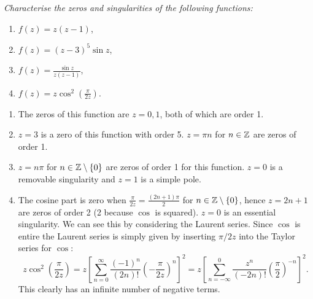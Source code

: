 \documentclass{article}
\begin{document}
    \begin{example}
        {\itshape
        Characterise the zeros and singularities of the following functions:
        \begin{enumerate}
            \item \(f(z) = z(z - 1)\),
            \item \(f(z) = (z - 3)^5\sin z\),
            \item \(f(z) = \frac{\sin z}{z(z - 1)}\),
            \item \(f(z) = z\cos^2\left( \frac{\pi}{2z} \right)\).
        \end{enumerate}
        }
        \begin{enumerate}
            \item The zeros of this function are \(z = 0, 1\), both of which are order 1.
            \item \(z = 3\) is a zero of this function with order 5.
            \(z = \pi n\) for \(n\in\mathbb{Z}\) are zeros of order 1.
            \item \(z = n\pi\) for \(n\in\mathbb{Z}\setminus\{0\}\) are zeros of order 1 for this function.
            \(z = 0\) is a removable singularity and \(z = 1\) is a simple pole.
            \item The cosine part is zero when \(\frac{\pi}{2z} = \frac{(2n+1)\pi}{2}\) for \(n\in\mathbb{Z}\setminus\{0\}\), hence \(z = 2n + 1\) are zeros of order 2 (2 because \(\cos\) is squared).
            \(z = 0\) is an essential singularity.
            We can see this by considering the Laurent series.
            Since \(\cos\) is entire the Laurent series is simply given by inserting \(\pi/2z\) into the Taylor series for \(\cos\):
            \[z\cos^2\left( \frac{\pi}{2z} \right) = z\left[ \sum_{n=0}^{\infty} \frac{(-1)^n}{(2n)!}\left( -\frac{\pi}{2z} \right)^n \right]^2 = z\left[ \sum_{n=-\infty}^{0} \frac{z^n}{(-2n)!}\left( \frac{\pi}{2} \right)^{-n} \right]^2.\]
            This clearly has an infinite number of negative terms.
        \end{enumerate}
    \end{example}
    
\end{document}
